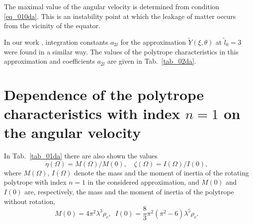 \documentclass{caosp308}
\begin{document}
The maximal value of the angular velocity is determined from condition \eqref{eq_010da}. This is an instability point at which the leakage of matter occurs from the vicinity of the equator.

In our work \citet{2019MMC.6...153V}, integration constants $a_{2l}$ for the approximation $\tilde{Y}(\xi,\theta)$ at $\tilde{l}_0=3$ were found in a similar way. The values of the polytrope characteristics in this approximation and coefficients $a_{2l}$ are given in Tab.~\ref{tab_02da}.


\section{Dependence of the polytrope characteristics with index $n=1$ on the angular velocity}
\label{sect_05da}

In Tab.~\ref{tab_01da} there are also shown the values
\begin{equation}
\label{eq_047da}
\eta(\Omega)=M(\Omega)/M(0), \quad \zeta(\Omega)=I(\Omega)/I(0),
\end{equation}
where $M(\Omega),\,I(\Omega)$ denote the mass and the moment of inertia of the rotating polytrope with index $n=1$ in the considered approximation, and $M(0)$ and $I(0)$ are, respectively, the mass and the moment of inertia of the polytrope without rotation,
\begin{equation}
\label{eq_048da}
M(0)=4\pi^2\lambda^3\rho_c,\,\,\,I(0)=\frac{8}{3}\pi^2(\pi^2-6)\lambda^5\rho_c.
\end{equation}
\end{document}
